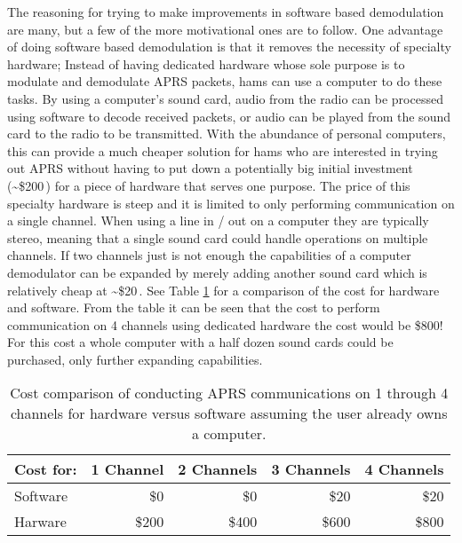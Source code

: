The reasoning for trying to make improvements in software based demodulation are many, but a few of the more motivational ones are to follow. One advantage of doing software based demodulation is that it removes the necessity of specialty hardware; Instead of having dedicated hardware whose sole purpose is to modulate and demodulate APRS packets, hams can use a computer to do these tasks. By using a computer's sound card, audio from the radio can be processed using software to decode received packets, or audio can be played from the sound card to the radio to be transmitted. With the abundance of personal computers, this can provide a much cheaper solution for hams who are interested in trying out APRS without having to put down a potentially big initial investment (\textasciitilde\$200\,\cite{Kantronics2014,Outlet2014}) for a piece of hardware that serves one purpose. The price of this specialty hardware is steep and it is limited to only performing communication on a single channel. When using a line in / out on a computer they are typically stereo, meaning that a single sound card could handle operations on multiple channels. If two channels just is not enough the capabilities of a computer demodulator can be expanded by merely adding another sound card which is relatively cheap at \textasciitilde\$20\,\cite{Newegg}. See Table \ref{costCompareTable} for a comparison of the cost for hardware and software. From the table it can be seen that the cost to perform communication on 4 channels using dedicated hardware the cost would be \$800! For this cost a whole computer with a half dozen sound cards could be purchased, only further expanding capabilities.
\begin{table}
	\begin{center}
		\begin{tabular}{ | l | r | r | r | r | }
		\hline
			Cost for: & 1 Channel & 2 Channels & 3 Channels & 4 Channels \\ \hline
			Software & \$0 & \$0 & \$20 & \$20 \\ \hline
			Harware & \$200 & \$400 & \$600 & \$800 \\
			\hline
		\end{tabular}
		\caption[Hardware and Software Cost Comparison]{Cost comparison of conducting APRS communications on 1 through 4 channels for hardware versus software assuming the user already owns a computer.}
		\label{costCompareTable}
	\end{center}
\end{table}

